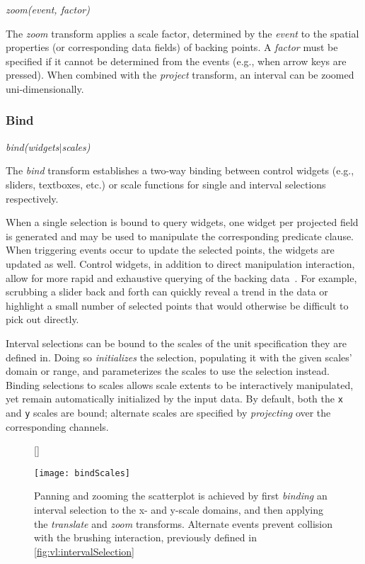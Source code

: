 \vspace{-7pt}

\centerline{\emph{zoom(event, factor)}}

The \emph{zoom} transform applies a scale factor, determined by the \emph{event}
to the spatial properties (or corresponding data fields) of backing points. A
\emph{factor} must be specified if it cannot be determined from the events
(e.g., when arrow keys are pressed). When combined with the \emph{project}
transform, an interval can be zoomed uni-dimensionally.

\vspace{-10pt}

\subsubsection{Bind}

\vspace{-7pt}

\centerline{\emph{bind(widgets$|$scales)}}

The \emph{bind} transform establishes a two-way binding between control widgets
(e.g., sliders, textboxes, etc.) or scale functions for single and interval
selections respectively.

When a single selection is bound to query widgets, one widget per projected
field is generated and may be used to manipulate the corresponding predicate
clause. When triggering events occur to update the selected points, the widgets
are updated as well. Control widgets, in addition to direct manipulation
interaction, allow for more rapid and exhaustive querying of the backing
data~\cite{shneiderman:dynamicqueries}. For example, scrubbing a slider back and
forth can quickly reveal a trend in the data or highlight a small number of
selected points that would otherwise be difficult to pick out directly.

Interval selections can be bound to the scales of the unit specification they
are defined in. Doing so \emph{initializes} the selection, populating it with
the given scales' domain or range, and parameterizes the scales to use the
selection instead. Binding selections to scales allows scale extents to be
interactively manipulated, yet remain automatically initialized by the input
data. By default, both the \texttt{x} and \texttt{y} scales are bound; alternate
scales are specified by \emph{projecting} over the corresponding channels.

\begin{figure}[h!]
[\FBwidth]
{\caption{Panning and zooming the scatterplot is achieved by first
\emph{binding} an interval selection to the x- and y-scale domains, and then
applying the \emph{translate} and \emph{zoom} transforms. Alternate events
prevent collision with the brushing interaction, previously defined in
\cref{fig:vl:intervalSelection}}
\label{fig:vl:bindScales}}
{\texttt{[image: bindScales]}}
\end{figure}

